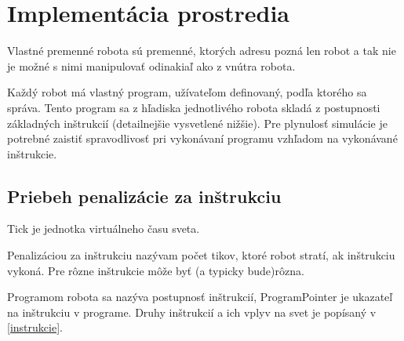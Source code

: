 \chapter{Implementácia prostredia}
\begin{definicia}
Vlastné premenné robota sú premenné, ktorých adresu pozná len robot a tak nie je možné s nimi manipulovať odinakiaľ ako z vnútra robota.
\end{definicia}

Každý robot má vlastný program, užívateľom definovaný, podľa ktorého sa správa. Tento program sa z hľadiska jednotlivého robota skladá z postupnosti základných inštrukcií (detailnejšie vysvetlené nižšie). Pre plynulosť simulácie je potrebné zaistiť spravodlivosť pri vykonávaní programu vzhľadom na vykonávané inštrukcie. 
\section{Priebeh penalizácie za inštrukciu}

\begin{definicia}
Tick je jednotka virtuálneho času sveta. 
\end{definicia}

\begin{definicia}
Penalizáciou za inštrukciu nazývam počet tikov, ktoré robot stratí, ak inštrukciu vykoná. Pre rôzne inštrukcie môže byť (a typicky bude)rôzna.
\end{definicia}

\begin{definicia}
Programom robota sa nazýva postupnosť inštrukcií, ProgramPointer je ukazateľ na inštrukciu v programe. Druhy inštrukcií a ich vplyv na svet je popísaný v \ref{instrukcie}.
\end{definicia}

